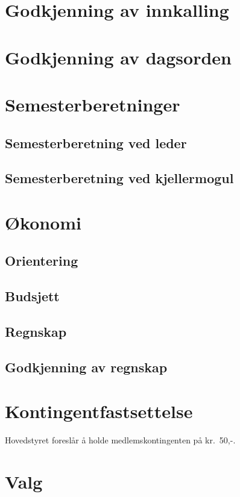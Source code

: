 \documentclass[10pt,norsk,a4paper,usenames,dvipsnames]{article}
\begin{document}
\section{Godkjenning av innkalling}


\section{Godkjenning av dagsorden}

\section{Semesterberetninger}
    \subsection{Semesterberetning ved leder}


    \subsection{Semesterberetning ved kjellermogul}



\section{Økonomi}

    \subsection{Orientering}
    \subsection{Budsjett}
    \subsection{Regnskap}
    \subsection{Godkjenning av regnskap}

\section{Kontingentfastsettelse}
    Hovedstyret foreslår å holde medlemskontingenten på kr.~50,-.


\section{Valg}
\end{document}
